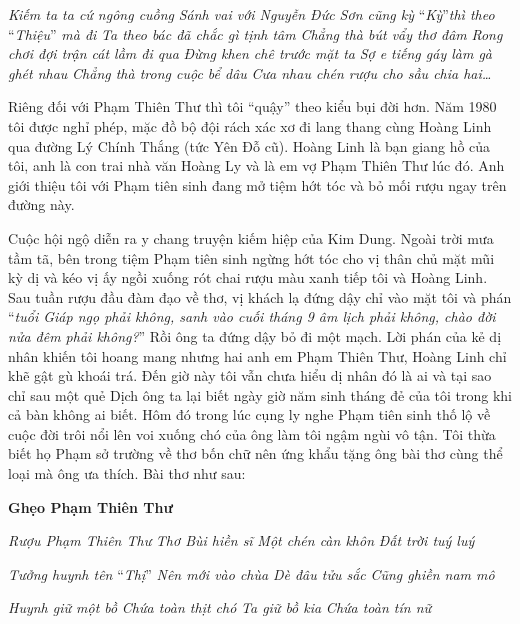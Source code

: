 \documentclass[../main.tex]{subfiles}
\begin{document}
\begin{multicols}{2}
\begin{blockquote}
\textit{Kiếm ta ta cứ ngông cuồng}        
\textit{Sánh vai với Nguyễn Ðức Sơn cũng kỳ}        
“\textit{Kỳ}”\textit{thì theo }“\textit{Thiệu}”\textit{ mà đi}        
\textit{Ta theo bác đã chắc gì tịnh tâm}        
\textit{Chẳng thà bút vẩy thơ đâm}        
\textit{Rong chơi đợi trận cát lầm đi qua}        
\textit{Ðừng khen chê trước mặt ta}        
\textit{Sợ e tiếng gáy làm gà ghét nhau}        
\textit{Chẳng thà trong cuộc bể dâu} 
\textit{Cưa nhau chén rượu cho sầu chia hai…} 

\end{blockquote}
 
Riêng đối với Phạm Thiên Thư thì tôi “quậy” theo kiểu bụi đời hơn. Năm 1980 tôi được nghỉ phép, mặc đồ bộ đội rách xác xơ đi lang thang cùng Hoàng Linh qua đường Lý Chính Thắng (tức Yên Ðỗ cũ). Hoàng Linh là bạn giang hồ của tôi, anh là con trai nhà văn Hoàng Ly và là em vợ Phạm Thiên Thư lúc đó. Anh giới thiệu tôi với Phạm tiên sinh đang mở tiệm hớt tóc và bỏ mối rượu ngay trên đường này. 
 
Cuộc hội ngộ diễn ra y chang truyện kiếm hiệp của Kim Dung. Ngoài trời mưa tầm tã, bên trong tiệm Phạm tiên sinh ngừng hớt tóc cho vị thân chủ mặt mũi kỳ dị và kéo vị ấy ngồi xuống rót chai rượu màu xanh tiếp tôi và Hoàng Linh. Sau tuần rượu đầu đàm đạo về thơ, vị khách lạ đứng dậy chỉ vào mặt tôi và phán “\textit{tuổi Giáp ngọ phải không, sanh vào cuối tháng 9 âm lịch phải không, chào đời nửa đêm phải không?}” Rồi ông ta đứng dậy bỏ đi một mạch. Lời phán của kẻ dị nhân khiến tôi hoang mang nhưng hai anh em Phạm Thiên Thư, Hoàng Linh chỉ khẽ gật gù khoái trá. Ðến giờ này tôi vẫn chưa hiểu dị nhân đó là ai và tại sao chỉ sau một quẻ Dịch ông ta lại biết ngày giờ năm sinh tháng đẻ của tôi trong khi cả bàn không ai biết. Hôm đó trong lúc cụng ly nghe Phạm tiên sinh thố lộ về cuộc đời trôi nổi lên voi xuống chó của ông làm tôi ngậm ngùi vô tận. Tôi thừa biết họ Phạm sở trường về thơ bốn chữ nên ứng khẩu tặng ông bài thơ cùng thể loại mà ông ưa thích. Bài thơ như sau: 
\begin{blockquote}
 
\textbf{Ghẹo Phạm Thiên Thư} 
        
\textit{Rượu Phạm Thiên Thư}        
\textit{Thơ Bùi hiền sĩ}        
\textit{Một chén càn khôn} 
\textit{Ðất trời tuý luý} 
        
\textit{Tưởng huynh tên }“\textit{Thị}”        
\textit{Nên mới vào chùa}        
\textit{Dè đâu tửu sắc} 
\textit{Cũng ghiền nam mô} 
        
\textit{Huynh giữ một bồ}        
\textit{Chứa toàn thịt chó}        
\textit{Ta giữ bồ kia} 
\textit{Chứa toàn tín nữ} 
        

\end{blockquote}
\end{multicols}
\end{document}
